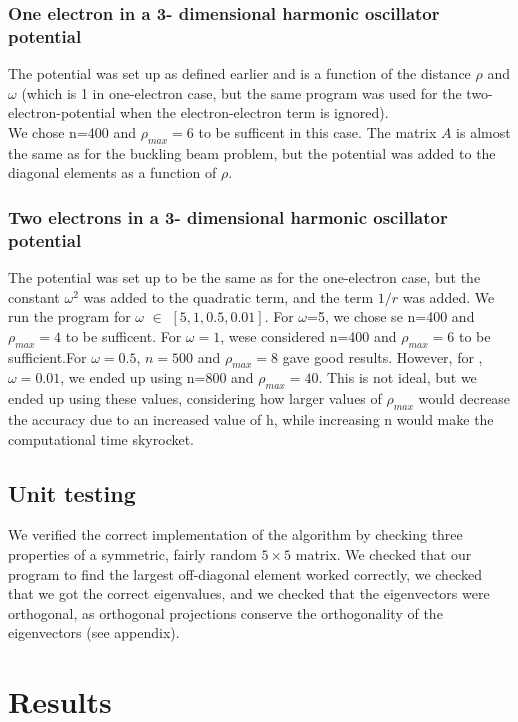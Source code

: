 \documentclass[10pt,a4paper]{article}
\begin{document}
\subsubsection{One electron in a 3- dimensional harmonic oscillator potential}
The potential was set up as defined earlier and is a function of the distance $\rho$ and $\omega$ (which is 1 in one-electron case, but the same program was used for the two-electron-potential when the electron-electron term is ignored). \\
We chose n=400 and  $\rho_{max}=6$ to be sufficent in this case. The matrix $A$ is almost the same as for the buckling beam problem, but the potential was added to the diagonal elements as a function of $\rho$.
\subsubsection{Two electrons in a 3- dimensional harmonic oscillator potential}
The potential was set up to be the same as for the one-electron case, but the constant  $\omega^2$ was added to the quadratic term, and the term $1/r$ was added. We run the program for  $\omega$ $\in$ $[5,1,0.5,0.01]$. 
For $\omega$=5, we chose se n=400 and  $\rho_{max}=4$ to be sufficent. For $\omega=1$, wese considered n=400 and  $\rho_{max}=6$ to be sufficient.For $\omega=0.5$, $n=500$ and  $\rho_{max}=8$ gave good results. However, for ,$\omega=0.01$, we ended up using n=800 and   $\rho_{max}=40$. This is not ideal, but we ended up using these values, considering how larger values of  $\rho_{max}$ would decrease the accuracy due to an increased value of h, while increasing n would make the computational time skyrocket. 

\subsection{Unit testing}
We verified the correct implementation of the algorithm by checking three properties of a symmetric, fairly random $5\times 5$ matrix. We checked that our program to find the largest off-diagonal element worked correctly, we checked that we got the correct eigenvalues, and we checked that the eigenvectors were orthogonal, as orthogonal projections conserve the orthogonality of the eigenvectors (see appendix). 
\section{Results}
\end{document}
